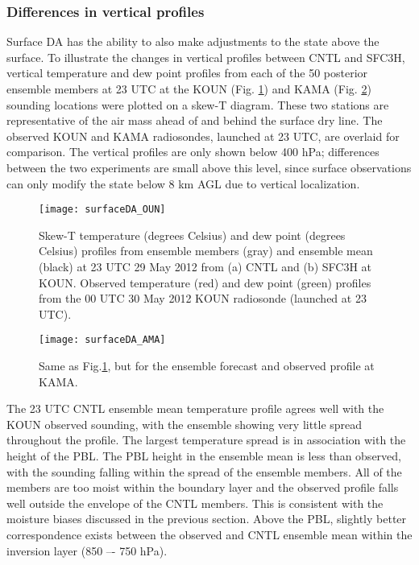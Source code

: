 \subsubsection{Differences in vertical profiles}
Surface DA has the ability to also make adjustments to the state above the surface. To illustrate the changes in vertical profiles between CNTL and SFC3H, vertical temperature and dew point profiles from each of the 50 posterior ensemble members at 23 UTC at the KOUN (Fig. \ref{sfcda_oun}) and KAMA (Fig. \ref{sfcda_ama}) sounding locations were plotted on a skew-T diagram. These two stations are representative of the air mass ahead of and behind the surface dry line. The observed KOUN and KAMA radiosondes, launched at 23 UTC, are overlaid for comparison. The vertical profiles are only shown below 400 hPa; differences between the two experiments are small above this level, since surface observations can only modify the state below 8 km AGL due to vertical localization.
\begin{figure}
\centering
\texttt{[image: surfaceDA\_OUN]}
\caption{Skew-T temperature (degrees Celsius) and dew point (degrees Celsius) profiles from ensemble members (gray) and ensemble mean (black) at 23 UTC 29 May 2012 from (a) CNTL and (b) SFC3H at KOUN. Observed temperature (red) and dew point (green) profiles from the 00 UTC 30 May 2012 KOUN radiosonde (launched at 23 UTC).}
\label{sfcda_oun}
\end{figure}
\begin{figure}
\centering
\texttt{[image: surfaceDA\_AMA]}
\caption{Same as Fig.\ref{sfcda_oun}, but for the ensemble forecast and observed profile at KAMA.}
\label{sfcda_ama}
\end{figure}

The 23 UTC CNTL ensemble mean temperature profile agrees well with the KOUN observed sounding, with the ensemble showing very little spread throughout the profile. The largest temperature spread is in association with the height of the PBL. The PBL height in the ensemble mean is less than observed, with the sounding falling within the spread of the ensemble members. All of the members are too moist within the boundary layer and the observed profile falls well outside the envelope of the CNTL members. This is consistent with the moisture biases discussed in the previous section. Above the PBL, slightly better correspondence exists between the observed and CNTL ensemble mean within the inversion layer (850 –- 750 hPa).

